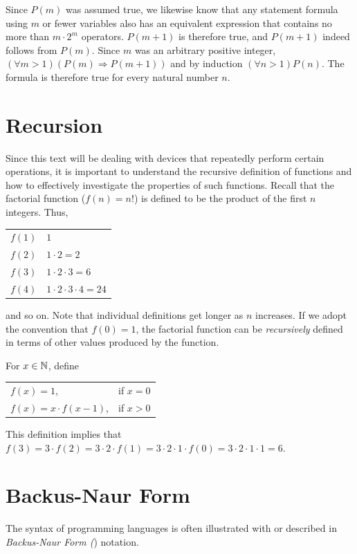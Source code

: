 Since $P(m)$ was assumed true, we likewise know that any statement formula
using $m$ or fewer variables also has an equivalent expression that contains no
more than $m \cdot 2^m$ operators. $P(m + 1)$ is therefore true, and $P(m + 1)$
indeed follows from $P(m)$. Since $m$ was an arbitrary positive integer,
$(\forall m > 1)(P(m) \Rightarrow P(m + 1))$ and by induction
$(\forall n > 1)P(n)$. The formula is therefore true for every natural number
$n$.

\section{Recursion}\label{sec-0.5}

Since this text will be dealing with devices that repeatedly perform certain
operations, it is important to understand the recursive definition of functions
and how to effectively investigate the properties of such functions. Recall that
the factorial function ($f(n) = n!$) is defined to be the product of the first
$n$ integers. Thus,
\begin{center}\begin{tabular}{r@{ $=$ }l}
$f(1)$ & $1$ \\
$f(2)$ & $1\cdot 2=2$ \\
$f(3)$ & $1\cdot 2\cdot 3=6$ \\
$f(4)$ & $1\cdot 2\cdot 3\cdot 4=24$
\end{tabular}\end{center}
and so on. Note that individual definitions get longer as $n$ increases. If we
adopt the convention that $f(0) = 1$, the factorial function can be \emph{recursively}
defined in terms of other values produced by the function.

\begin{dfn}\label{dfn-0.21}
For $x \in \mathbb{N}$, define
\begin{center}\begin{tabular}{ll}
$f(x) = 1$, & if $x = 0$ \\
$f(x) = x \cdot f(x-1)$, & if $x > 0$
\end{tabular}\end{center}
\end{dfn}

This definition implies that
$f(3)=3\cdot f(2) = 3\cdot 2\cdot f(1) = 3\cdot 2\cdot 1\cdot f(0) =
	3\cdot 2\cdot 1\cdot 1=6$.

\section{Backus-Naur Form}\label{sec-0.6}
The syntax of programming languages is often illustrated with
\emph{} or described in \emph{Backus-Naur Form (}) notation.

